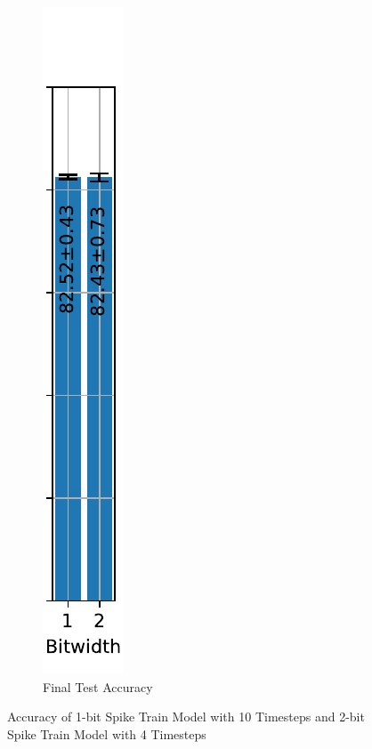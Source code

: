 \begin{figure}[H]
\begin{subfigure}[H]{0.1\textwidth}
                \includegraphics[width=\textwidth]{../timesteps/FashionMNIST/plots/fashionmnist_final_acc.pdf}
                \caption{Final Test Accuracy}
            \end{subfigure}
            \caption{Accuracy of 1-bit Spike Train Model with 10 Timesteps and 2-bit Spike Train Model with 4 Timesteps}
        \end{figure}

